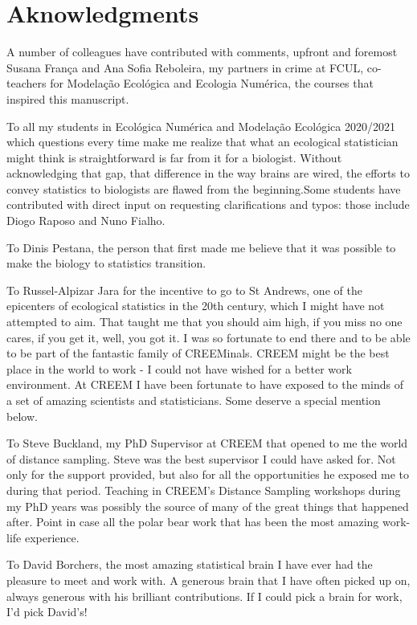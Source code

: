 \documentclass[
]{book}
\begin{document}
\hypertarget{aknowledgments}{%
\chapter{Aknowledgments}\label{aknowledgments}}

A number of colleagues have contributed with comments, upfront and foremost Susana França and Ana Sofia Reboleira, my partners in crime at FCUL, co-teachers for Modelação Ecológica and Ecologia Numérica, the courses that inspired this manuscript.

To all my students in Ecológica Numérica and Modelação Ecológica 2020/2021 which questions every time make me realize that what an ecological statistician might think is straightforward is far from it for a biologist. Without acknowledging that gap, that difference in the way brains are wired, the efforts to convey statistics to biologists are flawed from the beginning.Some students have contributed with direct input on requesting clarifications and typos: those include Diogo Raposo and Nuno Fialho.

To Dinis Pestana, the person that first made me believe that it was possible to make the biology to statistics transition.

To Russel-Alpizar Jara for the incentive to go to St Andrews, one of the epicenters of ecological statistics in the 20th century, which I might have not attempted to aim. That taught me that you should aim high, if you miss no one cares, if you get it, well, you got it. I was so fortunate to end there and to be able to be part of the fantastic family of CREEMinals. CREEM might be the best place in the world to work - I could not have wished for a better work environment. At CREEM I have been fortunate to have exposed to the minds of a set of amazing scientists and statisticians. Some deserve a special mention below.

To Steve Buckland, my PhD Supervisor at CREEM that opened to me the world of distance sampling. Steve was the best supervisor I could have asked for. Not only for the support provided, but also for all the opportunities he exposed me to during that period. Teaching in CREEM's Distance Sampling workshops during my PhD years was possibly the source of many of the great things that happened after. Point in case all the polar bear work that has been the most amazing work-life experience.

To David Borchers, the most amazing statistical brain I have ever had the pleasure to meet and work with. A generous brain that I have often picked up on, always generous with his brilliant contributions. If I could pick a brain for work, I'd pick David's!
\end{document}
